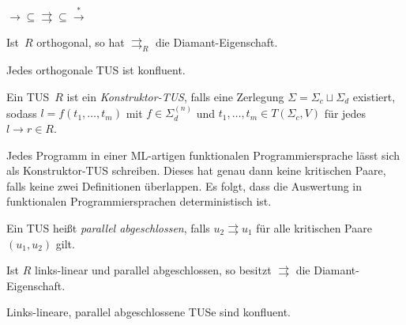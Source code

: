\documentclass{cheat-sheet}
\newcommand{\reducesTo}{\xrightarrow{*}}
\newcommand{\parallelTo}{\rightrightarrows} %
\begin{document}
\begin{fakt}
  ${\to} \subseteq {\parallelTo} \subseteq {\reducesTo}$
\end{fakt}


\begin{thm}
  Ist~$R$ orthogonal, so hat ${\parallelTo}_R$ die Diamant-Eigenschaft.
\end{thm}

\begin{kor}
  Jedes orthogonale TUS ist konfluent.
\end{kor}

\begin{defn}
  Ein TUS~$R$ ist ein \emph{Konstruktor-TUS}, falls eine Zerlegung $\Sigma = \Sigma_c \sqcup \Sigma_d$ existiert, sodass
  $l = f(t_1, \ldots, t_m)$ mit $f \in \Sigma_d^{(n)}$ und $t_1, \ldots, t_m \in T(\Sigma_c, V)$ für jedes $l \to r \in R$.
\end{defn}

\begin{bem}
  Jedes Programm in einer ML-artigen funktionalen Programmiersprache lässt sich als Konstruktor-TUS schreiben.
  Dieses hat genau dann keine kritischen Paare, falls keine zwei Definitionen überlappen.
  Es folgt, dass die Auswertung in funktionalen Programmiersprachen deterministisch ist.
\end{bem}


\begin{defn}
  Ein TUS heißt \emph{parallel abgeschlossen}, falls $u_2 \parallelTo u_1$ für alle kritischen Paare $(u_1, u_2)$ gilt.
\end{defn}


\begin{thm}
  Ist $R$ links-linear und parallel abgeschlossen, so besitzt ${\parallelTo}$ die Diamant-Eigenschaft.
\end{thm}

\begin{kor}
  Links-lineare, parallel abgeschlossene TUSe sind konfluent.
\end{kor}
\end{document}
